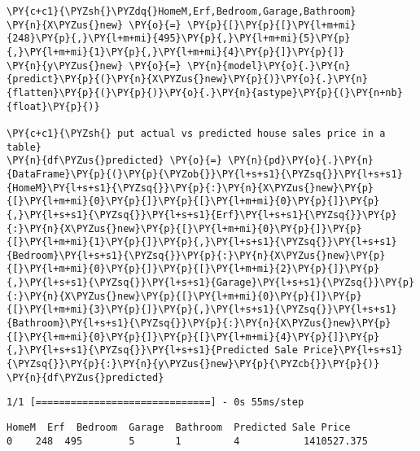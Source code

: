     \begin{tcolorbox}[breakable, size=fbox, boxrule=1pt, pad at break*=1mm,colback=cellbackground, colframe=cellborder]
\begin{Verbatim}[commandchars=\\\{\}]
\PY{c+c1}{\PYZsh{}\PYZdq{}HomeM,Erf,Bedroom,Garage,Bathroom}
\PY{n}{X\PYZus{}new} \PY{o}{=} \PY{p}{[}\PY{p}{[}\PY{l+m+mi}{248}\PY{p}{,}\PY{l+m+mi}{495}\PY{p}{,}\PY{l+m+mi}{5}\PY{p}{,}\PY{l+m+mi}{1}\PY{p}{,}\PY{l+m+mi}{4}\PY{p}{]}\PY{p}{]}
\PY{n}{y\PYZus{}new} \PY{o}{=} \PY{n}{model}\PY{o}{.}\PY{n}{predict}\PY{p}{(}\PY{n}{X\PYZus{}new}\PY{p}{)}\PY{o}{.}\PY{n}{flatten}\PY{p}{(}\PY{p}{)}\PY{o}{.}\PY{n}{astype}\PY{p}{(}\PY{n+nb}{float}\PY{p}{)}

\PY{c+c1}{\PYZsh{} put actual vs predicted house sales price in a table}
\PY{n}{df\PYZus{}predicted} \PY{o}{=} \PY{n}{pd}\PY{o}{.}\PY{n}{DataFrame}\PY{p}{(}\PY{p}{\PYZob{}}\PY{l+s+s1}{\PYZsq{}}\PY{l+s+s1}{HomeM}\PY{l+s+s1}{\PYZsq{}}\PY{p}{:}\PY{n}{X\PYZus{}new}\PY{p}{[}\PY{l+m+mi}{0}\PY{p}{]}\PY{p}{[}\PY{l+m+mi}{0}\PY{p}{]}\PY{p}{,}\PY{l+s+s1}{\PYZsq{}}\PY{l+s+s1}{Erf}\PY{l+s+s1}{\PYZsq{}}\PY{p}{:}\PY{n}{X\PYZus{}new}\PY{p}{[}\PY{l+m+mi}{0}\PY{p}{]}\PY{p}{[}\PY{l+m+mi}{1}\PY{p}{]}\PY{p}{,}\PY{l+s+s1}{\PYZsq{}}\PY{l+s+s1}{Bedroom}\PY{l+s+s1}{\PYZsq{}}\PY{p}{:}\PY{n}{X\PYZus{}new}\PY{p}{[}\PY{l+m+mi}{0}\PY{p}{]}\PY{p}{[}\PY{l+m+mi}{2}\PY{p}{]}\PY{p}{,}\PY{l+s+s1}{\PYZsq{}}\PY{l+s+s1}{Garage}\PY{l+s+s1}{\PYZsq{}}\PY{p}{:}\PY{n}{X\PYZus{}new}\PY{p}{[}\PY{l+m+mi}{0}\PY{p}{]}\PY{p}{[}\PY{l+m+mi}{3}\PY{p}{]}\PY{p}{,}\PY{l+s+s1}{\PYZsq{}}\PY{l+s+s1}{Bathroom}\PY{l+s+s1}{\PYZsq{}}\PY{p}{:}\PY{n}{X\PYZus{}new}\PY{p}{[}\PY{l+m+mi}{0}\PY{p}{]}\PY{p}{[}\PY{l+m+mi}{4}\PY{p}{]}\PY{p}{,}\PY{l+s+s1}{\PYZsq{}}\PY{l+s+s1}{Predicted Sale Price}\PY{l+s+s1}{\PYZsq{}}\PY{p}{:}\PY{n}{y\PYZus{}new}\PY{p}{\PYZcb{}}\PY{p}{)}
\PY{n}{df\PYZus{}predicted}
\end{Verbatim}
\end{tcolorbox}

    \begin{Verbatim}[commandchars=\\\{\}]
1/1 [==============================] - 0s 55ms/step
    \end{Verbatim}

            \begin{tcolorbox}[breakable, size=fbox, boxrule=.5pt, pad at break*=1mm, opacityfill=0]
\begin{Verbatim}[commandchars=\\\{\}]
   HomeM  Erf  Bedroom  Garage  Bathroom  Predicted Sale Price
0    248  495        5       1         4           1410527.375
\end{Verbatim}
\end{tcolorbox}
        

